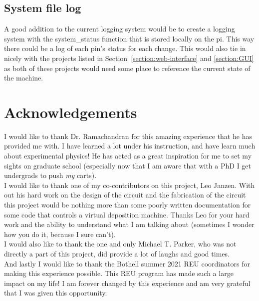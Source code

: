 \documentclass[titlepage]{article}
\begin{document}
\subsection{System file log}
\label{section:systemstatchange}
A good addition to the current logging system would be to create a logging system with the system\_status function that is stored locally on the pi. This way there could be a log of each pin's status for each change. This would also tie in nicely with the projects listed in Section~\ref{section:web-interface} and \ref{section:GUI} as both of these projects would need some place to reference the current state of the machine.

\section{Acknowledgements}
I would like to thank Dr. Ramachandran for this amazing experience that he has provided me with. I have learned a lot under his instruction, and have learn much about experimental physics! He has acted as a great inspiration for me to set my sights on graduate school (especially now that I am aware that with a PhD I get undergrads to push \textit{my} carts). \\

I would like to thank one of my co-contributors on this project, Leo Janzen. With out his hard work on the design of the circuit and the fabrication of the circuit this project would be nothing more than some poorly written documentation for some code that controls a virtual deposition machine. Thanks Leo for your hard work and the ability to understand what I am talking about (sometimes I wonder how you do it, because I sure can't).\\

I would also like to thank the one and only Michael T. Parker, who was not directly a part of this project, did provide a lot of laughs and good times.\\

And lastly I would like to thank the Bothell summer 2021 REU coordinators for making this experience possible. This REU program has made such a large impact on my life! I am forever changed by this experience and am very grateful that I was given this opportunity.
\end{document}
